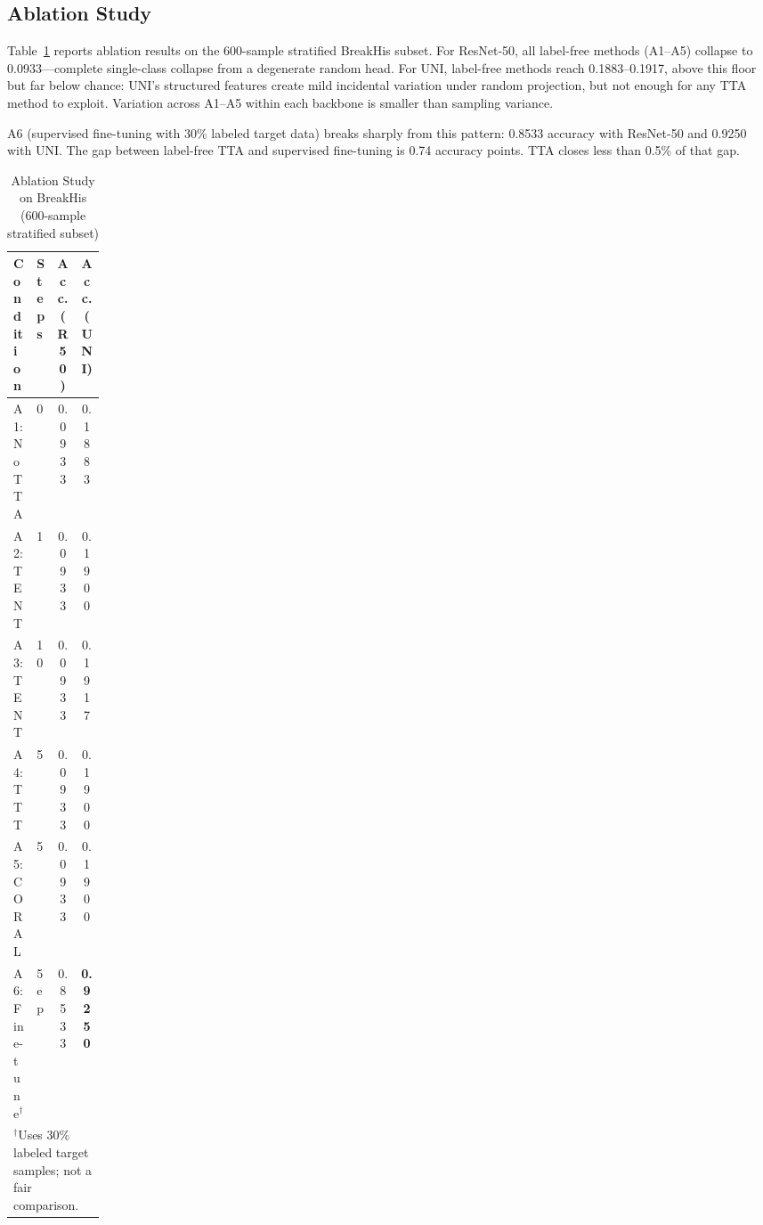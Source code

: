 \documentclass[conference]{IEEEtran}
\begin{document}

\subsection{Ablation Study}

Table~\ref{tab:ablation} reports ablation results on the 600-sample stratified BreakHis subset. For ResNet-50, all label-free methods (A1--A5) collapse to 0.0933---complete single-class collapse from a degenerate random head. For UNI, label-free methods reach 0.1883--0.1917, above this floor but far below chance: UNI's structured features create mild incidental variation under random projection, but not enough for any TTA method to exploit. Variation across A1--A5 within each backbone is smaller than sampling variance.

A6 (supervised fine-tuning with 30\% labeled target data) breaks sharply from this pattern: 0.8533 accuracy with ResNet-50 and 0.9250 with UNI. The gap between label-free TTA and supervised fine-tuning is 0.74 accuracy points. TTA closes less than 0.5\% of that gap.

\begin{table}[!hbt]
\caption{Ablation Study on BreakHis (600-sample stratified subset)}
\label{tab:ablation}
\centering
\begin{tabular}{lp{0.12\linewidth}cc}
\toprule
\textbf{Condition} & \textbf{Steps} & \textbf{Acc. (R50)} & \textbf{Acc. (UNI)} \\
\midrule
A1: No TTA           & 0    & 0.0933 & 0.1883 \\
A2: TENT             & 1    & 0.0933 & 0.1900 \\
A3: TENT             & 10   & 0.0933 & 0.1917 \\
A4: TTT              & 5    & 0.0933 & 0.1900 \\
A5: CORAL            & 5    & 0.0933 & 0.1900 \\
\midrule
A6: Fine-tune$^\dagger$ & 5 ep & 0.8533 & \textbf{0.9250} \\
\bottomrule
\multicolumn{4}{l}{$^\dagger$Uses 30\% labeled target samples; not a fair comparison.} \\
\end{tabular}
\end{table}
\end{document}
